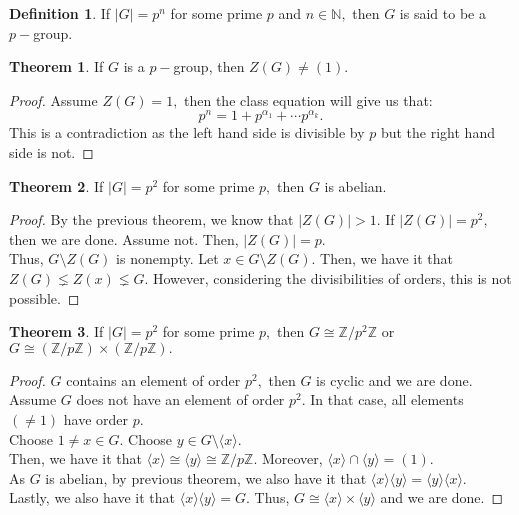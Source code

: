 \documentclass[12 pt, a4paper, toc=graduated, oneside]{article}
\theoremstyle{definition}
\newtheorem{defn}{Definition}
\newtheorem{theorem}{Theorem}
\begin{document}
\begin{defn}
	If $|G| = p^n$ for some prime $p$ and $n \in \mathbb{N},$ then $G$ is said to be a $p-$group.
\end{defn}
\begin{theorem}
	If $G$ is a $p-$group, then $Z(G) \neq (1).$
\end{theorem}
\begin{proof}
	Assume $Z(G) = 1,$ then the class equation will give us that:
	\[p^n = 1 + p^{\alpha_1} + \cdots p^{\alpha_k}.\]
	This is a contradiction as the left hand side is divisible by $p$ but the right hand side is not.
\end{proof}
\begin{theorem}
	If $|G| = p^2$ for some prime $p,$ then $G$ is abelian.
\end{theorem}
\begin{proof}
	By the previous theorem, we know that $|Z(G)| > 1.$ If $|Z(G)| = p^2,$ then we are done. Assume not. Then, $|Z(G)| = p.$\\
	Thus, $G \setminus Z(G)$ is nonempty. Let $x \in G\setminus Z(G).$ Then, we have it that $Z(G) \lneq Z(x) \lneq G.$ However, considering the divisibilities of orders, this is not possible.
\end{proof}
\begin{theorem}
	If $|G| = p^2$ for some prime $p,$ then $G \cong \mathbb{Z}/p^2\mathbb{Z}$ or $G \cong (\mathbb{Z}/p\mathbb{Z})\times (\mathbb{Z}/p\mathbb{Z}).$
\end{theorem}
\begin{proof}
	$G$ contains an element of order $p^2,$ then $G$ is cyclic and we are done.\\
	Assume $G$ does not have an element of order $p^2.$ In that case, all elements $(\neq1)$ have order $p.$\\
	Choose $1 \neq x \in G.$ Choose $y \in G \setminus \langle x\rangle.$\\
	Then, we have it that $\langle x\rangle \cong \langle y\rangle \cong \mathbb{Z}/p\mathbb{Z}.$ Moreover, $\langle x\rangle \cap \langle y\rangle = (1).$\\
	As $G$ is abelian, by previous theorem, we also have it that $\langle x\rangle \langle y\rangle = \langle y\rangle\langle x\rangle .$\\
	Lastly, we also have it that $\langle x\rangle\langle y\rangle = G.$ Thus, $G \cong \langle x\rangle\times\langle y\rangle$ and we are done.
\end{proof}
\end{document}
